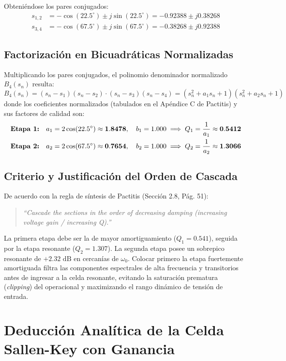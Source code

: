 \documentclass[a4paper,11pt]{article}
\begin{document}
Obteniéndose los pares conjugados:
\begin{align}
s_{1,2} &= -\cos(22.5^\circ) \pm j \sin(22.5^\circ) = -0.92388 \pm j 0.38268 \\
s_{3,4} &= -\cos(67.5^\circ) \pm j \sin(67.5^\circ) = -0.38268 \pm j 0.92388
\end{align}

\subsection{Factorización en Bicuadráticas Normalizadas}
Multiplicando los pares conjugados, el polinomio denominador normalizado $B_4(s_n)$ resulta:
\begin{equation}
B_4(s_n) = (s_n - s_1)(s_n - s_2) \cdot (s_n - s_3)(s_n - s_4) = (s_n^2 + a_1 s_n + 1)(s_n^2 + a_2 s_n + 1)
\end{equation}
donde los coeficientes normalizados (tabulados en el Apéndice C de Pactitis) y sus factores de calidad son:
\begin{align}
\text{\textbf{Etapa 1:}} \quad a_1 &= 2\cos(22.5^\circ) \approx \mathbf{1.8478}, \quad b_1 = 1.000 \implies Q_1 = \frac{1}{a_1} \approx \mathbf{0.5412} \\
\text{\textbf{Etapa 2:}} \quad a_2 &= 2\cos(67.5^\circ) \approx \mathbf{0.7654}, \quad b_2 = 1.000 \implies Q_2 = \frac{1}{a_2} \approx \mathbf{1.3066}
\end{align}

\subsection{Criterio y Justificación del Orden de Cascada}
De acuerdo con la regla de síntesis de Pactitis (Sección 2.8, Pág. 51):
\begin{quote}
\textit{``Cascade the sections in the order of decreasing damping (increasing voltage gain / increasing Q).''}
\end{quote}
La primera etapa debe ser la de mayor amortiguamiento ($Q_1 = 0.541$), seguida por la etapa resonante ($Q_2 = 1.307$). La segunda etapa posee un sobrepico resonante de $+2.32\text{ dB}$ en cercanías de $\omega_0$. Colocar primero la etapa fuertemente amortiguada filtra las componentes espectrales de alta frecuencia y transitorios antes de ingresar a la celda resonante, evitando la saturación prematura (\textit{clipping}) del operacional y maximizando el rango dinámico de tensión de entrada.

\section{Deducción Analítica de la Celda Sallen-Key con Ganancia}
\end{document}
